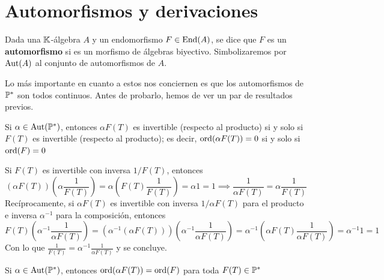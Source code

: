 \section{Automorfismos y derivaciones}

\begin{definicion}
    Dada una $\mathbb{K}$-álgebra $A$ y un endomorfismo $F \in \operatorname*{End}(A)$, se dice que $F$ es un \textbf{automorfismo} si es un morfismo de álgebras biyectivo. Simbolizaremos por $\operatorname*{Aut}(A)$ al conjunto de automorfismos de $A$.
\end{definicion}

Lo más importante en cuanto a estos nos conciernen es que los automorfismos de $\mathbb{P}^*$ son todos continuos. Antes de probarlo, hemos de ver un par de resultados previos.

\begin{lema}
    Si $\alpha \in \operatorname*{Aut}(\mathbb{P}^*)$, entonces $\alpha F(T)$ es invertible (respecto al producto) si y solo si $F(T)$ es invertible (respecto al producto); es decir, $\operatorname*{ord}(\alpha F(T)) = 0$ si y solo si $\operatorname*{ord}(F) = 0$
\end{lema}

\begin{demo}
    Si $F(T)$ es invertible con inversa $1/F(T)$, entonces
    \begin{equation*}
        (\alpha F(T))\left(\alpha \frac{1}{F(T)}\right)= \alpha\left(F(T) \frac{1}{F(T)}\right) = \alpha 1 = 1 \implies \frac{1}{\alpha F(T)} = \alpha \frac{1}{F(T)}
    \end{equation*}
    Recíprocamente, si $\alpha F(T)$ es invertible con inversa $1/\alpha F(T)$ para el producto e inversa $\alpha^{-1}$ para la composición, entonces
    \begin{equation*}
        F(T) \left(\alpha^{-1} \frac{1}{\alpha F(T)}\right) = \left(\alpha^{-1}(\alpha F(T))\right) \left(\alpha^{-1} \frac{1}{\alpha F(T)}\right) = \alpha^{-1}\left(\alpha F(T) \frac{1}{\alpha F(T)}\right) = \alpha^{-1}1 = 1
    \end{equation*}
    Con lo que $\displaystyle \frac{1}{F(T)} = \alpha^{-1} \frac{1}{\alpha F(T)}$ y se concluye.
\end{demo}

\begin{teorema}
    Si $\alpha \in \operatorname*{Aut}(\mathbb{P}^*)$, entonces $\operatorname*{ord}(\alpha F(T)) = \operatorname*{ord}(F)$
    para toda $F(T) \in \mathbb{P}^*$
\end{teorema}

